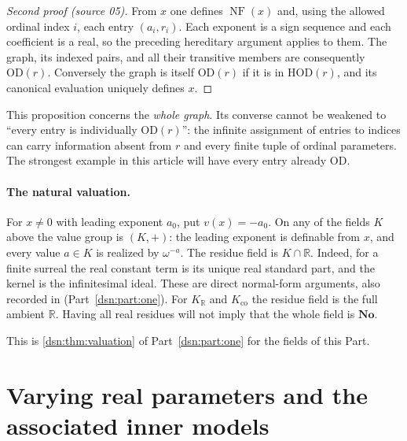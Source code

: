 \documentclass[11pt,a4paper]{article}
\numberwithin{equation}{section}
\theoremstyle{definition}
\theoremstyle{remark}
\newcommand{\No}{\mathbf{No}}
\newcommand{\OD}{\mathrm{OD}}
\newcommand{\HOD}{\mathrm{HOD}}
\newcommand{\R}{\mathbb R}
\newcommand{\NF}{\operatorname{NF}}
\newcommand{\KR}{K_{\R}}
\newcommand{\Kco}{K_{\mathrm{co}}}
\begin{document}
\begin{proof}[Second proof (source 05)]
From $x$ one defines $\NF(x)$ and, using the allowed ordinal index $i$,
each entry $(a_i,r_i)$. Each exponent is a sign sequence and each
coefficient is a real, so the preceding hereditary argument applies
to them. The graph, its indexed pairs, and all their transitive members
are consequently $\OD(r)$. Conversely the graph is itself $\OD(r)$ if
it is in $\HOD(r)$, and its canonical evaluation uniquely defines $x$.
\end{proof}
This proposition concerns the \emph{whole graph}. Its converse cannot
be weakened to ``every entry is individually $\OD(r)$'': the infinite
assignment of entries to indices can carry information absent from
$r$ and every finite tuple of ordinal parameters. The strongest example
in this article will have every entry already $\OD$.
\paragraph{The natural valuation.}
For $x\ne0$ with leading exponent $a_0$, put $v(x)=-a_0$. On any of the
fields $K$ above the value group is $(K,+)$: the leading exponent is
definable from $x$, and every value $a\in K$ is realized by
$\omega^{-a}$. The residue field is $K\cap\R$. Indeed, for a finite
surreal the real constant term is its unique real standard part, and
the kernel is the infinitesimal ideal. These are direct normal-form
arguments, also recorded in (Part~\ref{dsn:part:one}).
For $\KR$ and $\Kco$ the residue field is the full ambient $\R$.
Having all real residues will not imply that the whole field is $\No$.

This is \cref{dsn:thm:valuation} of Part~\ref{dsn:part:one} for the fields
of this Part.

\section{Varying real parameters and the associated inner models}
\label{dsn:rp:sec:real-parameters}
\end{document}
